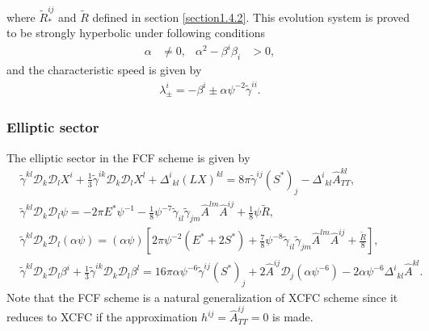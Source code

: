 where $\tilde{R}^{ij}_*$ and $\tilde{R}$ defined in section \ref{section1.4.2}.
This evolution system is proved to be strongly hyperbolic \cite{cordero2008mathematical} under following conditions
\begin{align}
    \alpha &\neq 0, & \alpha^2 - \beta^i \beta_i &> 0,
\end{align}
and the characteristic speed is given by
\begin{align}
    \lambda^i_{\pm} = -\beta^i \pm \alpha\psi^{-2} \tilde{\gamma}^{ii}.
\end{align}

\subsubsection{Elliptic sector}
The elliptic sector in the FCF scheme is given by
\begin{align}
    &\tilde{\gamma}^{kl} \mathcal{D}_k \mathcal{D}_l X^i + \frac{1}{3}\tilde{\gamma}^{ik}\mathcal{D}_k \mathcal{D}_l X^l
    + \Delta^i{}_{kl} \left( LX \right)^{kl} = 8\pi \tilde{\gamma}^{ij} \left( S^* \right)_j - \Delta^i{}_{kl} \hat{A}^{kl}_{TT}, \\
    & \tilde{\gamma}^{kl} \mathcal{D}_k \mathcal{D}_l \psi = - 2\pi E^* \psi^{-1} 
    - \frac{1}{8} \psi^{-7} \tilde{\gamma}_{il} \tilde{\gamma}_{jm} \hat{A}^{lm} \hat{A}^{ij} + \frac{1}{8}\psi \tilde{R}, \\
    & \tilde{\gamma}^{kl} \mathcal{D}_k \mathcal{D}_l \left( \alpha \psi \right) = \left(\alpha\psi\right)
    \left[ 2\pi\psi^{-2} \left(E^* + 2 S^* \right) + \frac{7}{8}\psi^{-8}\tilde{\gamma}_{il} \tilde{\gamma}_{jm} \hat{A}^{lm} \hat{A}^{ij}
    + \frac{\tilde{R}}{8}\right], \\
    &\tilde{\gamma}^{kl} \mathcal{D}_k \mathcal{D}_l \beta^i + \frac{1}{3}\tilde{\gamma}^{ik}\mathcal{D}_k \mathcal{D}_l \beta^l =
    16 \pi \alpha \psi^{-6} \tilde{\gamma}^{ij} \left( S^* \right)_j + 2 \hat{A}^{ij} \mathcal{D}_j \left(\alpha \psi^{-6} \right)
    - 2 \alpha \psi^{-6} \Delta^i{}_{kl} \hat{A}^{kl}.
\end{align}
Note that the FCF scheme is a natural generalization of XCFC scheme 
since it reduces to XCFC if the approximation $h^{ij} = \hat{A}^{ij}_{TT} = 0$ is made.

